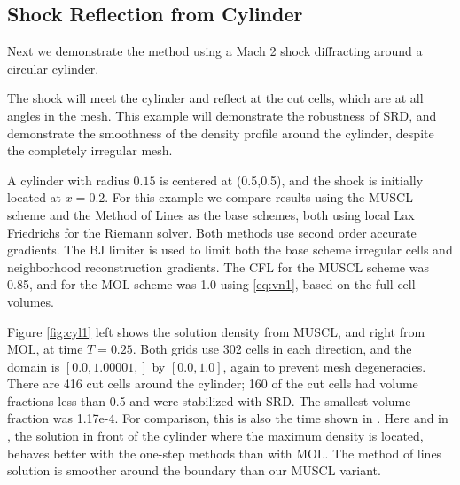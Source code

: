 \subsection{Shock Reflection from  Cylinder}
Next we demonstrate the method using a Mach 2
shock diffracting around a circular cylinder. 

The shock will meet the cylinder and reflect at the cut cells, which are
at all angles in the mesh. This
example will demonstrate the robustness of SRD, and demonstrate the
smoothness of the density profile around the cylinder, despite the
completely irregular mesh.

A cylinder with radius $0.15$ is centered at
(0.5,0.5), and the shock is initially located at $x = 0.2$.
For this example we compare results using the MUSCL scheme and
the Method of Lines as the base schemes, both using local Lax Friedrichs for the Riemann
solver. Both methods use second order accurate gradients. The BJ 
limiter is used to limit
both the base scheme irregular cells  and neighborhood reconstruction gradients. 
The CFL for the MUSCL scheme was 0.85, and for the MOL
scheme was 1.0 using \eqref{eq:vn1}, based on the full cell volumes.

Figure \ref{fig:cyl1} left shows the solution density from MUSCL, and
right from MOL, at time $T=0.25$. 
Both grids use 302 cells in each
direction, and the domain is  $[0.0,1.00001,]$ by  $[0.0, 1.0]$, again to
prevent mesh degeneracies.
There are 416 cut cells
around the cylinder; 160 of the cut cells had volume fractions less than
0.5 and were stabilized with SRD.  The smallest volume fraction was 1.17e-4.   
For comparison, this is also the time shown in \cite{mjb-hel-rjl:hbox2}. 
Here and in \cite{mjb-hel-rjl:hbox2}, the solution in front of the cylinder 
where the
maximum density is located, behaves better with the one-step methods than with
MOL.  The method of lines solution is smoother around the boundary than our
MUSCL variant. 

